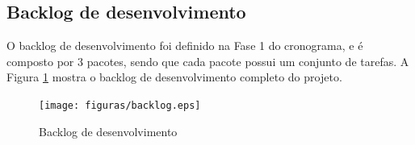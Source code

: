 \subsection{Backlog de desenvolvimento}

O backlog de desenvolvimento foi definido na Fase 1 do cronograma, e é composto por 3 pacotes, sendo que cada pacote possui um conjunto de tarefas. A Figura \ref{fig:backlog} mostra o backlog de desenvolvimento completo do projeto.

\begin{figure}[H]
    \centering
    \texttt{[image: figuras/backlog.eps]}
    \caption{Backlog de desenvolvimento}
    \label{fig:backlog}
\end{figure}